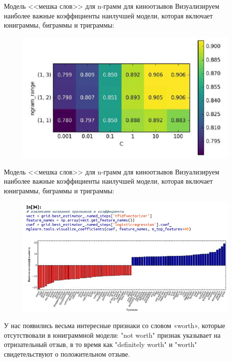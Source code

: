\documentclass{beamer}
\begin{document}
\begin{frame}{Модель <<мешка слов>> для n-грамм для киноотзывов}
Визуализируем наиболее важные коэффициенты наилучшей модели, которая включает юниграммы, биграммы и триграммы:
\begin{figure}[h]
\centering
\includegraphics[scale=0.5]{images/lec09-pic34.png}
\end{figure}
\end{frame}

\begin{frame}{Модель <<мешка слов>> для n-грамм для киноотзывов}
Визуализируем наиболее важные коэффициенты наилучшей модели, которая включает юниграммы, биграммы и триграммы:
\begin{figure}[h]
\centering
\includegraphics[scale=0.5]{images/lec09-pic35.png}
\end{figure}
У нас появились весьма интересные признаки со словом «worth», которые отсутствовали в юниграммной модели: "not worth" признак указывает на отризательный отзыв, в то время как "definitely worth" и
"worth" свидетельствуют о положительном отзыве. 
\end{frame}
\end{document}
